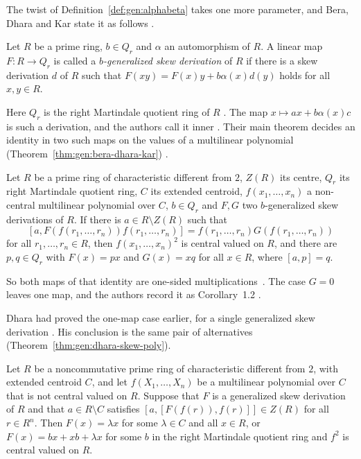 The twist of Definition~\ref{def:gen:alphabeta} takes one more parameter, and
Bera, Dhara and Kar state it as follows \cite[p.~888]{BeraDharaKar2023}.

\begin{definition}\label{def:gen:b-generalized-skew}
Let $R$ be a prime ring, $b\in Q_{r}$ and $\alpha$ an automorphism of $R$. A
linear map $F\colon R\to Q_{r}$ is called a \emph{$b$-generalized skew
derivation} of $R$ if there is a skew derivation $d$ of $R$ such that
$F(xy)=F(x)y+b\alpha(x)d(y)$ holds for all $x,y\in R$.
\end{definition}

Here $Q_{r}$ is the right Martindale quotient ring of $R$
\cite[p.~888]{BeraDharaKar2023}. The map $x\mapsto ax+b\alpha(x)c$ is such a
derivation, and the authors call it inner \cite[p.~888]{BeraDharaKar2023}.
Their main theorem decides an identity in two such maps on the values of a
multilinear polynomial (Theorem~\ref{thm:gen:bera-dhara-kar})
\cite[Theorem~1.1, p.~3]{BeraDharaKar2023}.

\begin{theorem}\label{thm:gen:bera-dhara-kar}
Let $R$ be a prime ring of characteristic different from $2$, $Z(R)$ its centre,
$Q_{r}$ its right Martindale quotient ring, $C$ its extended centroid,
$f(x_{1},\dots,x_{n})$ a non-central multilinear polynomial over $C$, $b\in Q_{r}$
and $F,G$ two $b$-generalized skew derivations of $R$. If there is
$a\in R\setminus Z(R)$ such that
\[
[a,F(f(r_{1},\dots,r_{n}))f(r_{1},\dots,r_{n})]
=f(r_{1},\dots,r_{n})G\left(f(r_{1},\dots,r_{n})\right)
\]
for all $r_{1},\dots,r_{n}\in R$, then $f(x_{1},\dots,x_{n})^{2}$ is central
valued on $R$, and there are $p,q\in Q_{r}$ with $F(x)=px$ and $G(x)=xq$ for all
$x\in R$, where $[a,p]=q$.
\end{theorem}

So both maps of that identity are one-sided multiplications~\cite[Corollary~1.2, p.~3]{BeraDharaKar2023}. The case $G=0$
leaves one map, and the authors record it as Corollary~1.2
\cite[Corollary~1.2, p.~3]{BeraDharaKar2023}.

Dhara had proved the one-map case earlier, for a single generalized skew
derivation \cite[p.~1]{Dhara2019Quaest}. His conclusion is the same pair of
alternatives (Theorem~\ref{thm:gen:dhara-skew-poly}).

\begin{theorem}\label{thm:gen:dhara-skew-poly}
Let $R$ be a noncommutative prime ring of characteristic different from $2$, with
extended centroid $C$, and let $f(X_{1},\dots,X_{n})$ be a multilinear polynomial
over $C$ that is not central valued on $R$. Suppose that $F$ is a generalized skew
derivation of $R$ and that $a\in R\setminus C$ satisfies
$[a,[F(f(r)),f(r)]]\in Z(R)$ for all $r\in R^{n}$. Then $F(x)=\lambda x$ for some
$\lambda\in C$ and all $x\in R$, or $F(x)=bx+xb+\lambda x$ for some $b$ in the right
Martindale quotient ring and $f^{2}$ is central valued on $R$.
\end{theorem}

